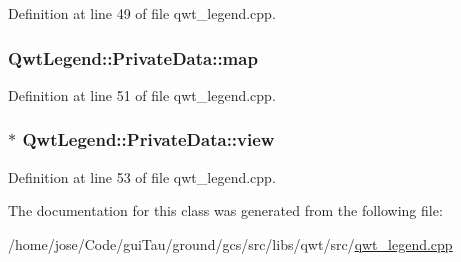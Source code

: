 Definition at line 49 of file qwt\-\_\-legend.\-cpp.

\hypertarget{class_qwt_legend_1_1_private_data_a921ea2a8e215eb723bb218ae2d199d15}{
\subsubsection[{map}]{ Qwt\-Legend\-::\-Private\-Data\-::map}}\label{class_qwt_legend_1_1_private_data_a921ea2a8e215eb723bb218ae2d199d15}


Definition at line 51 of file qwt\-\_\-legend.\-cpp.

\hypertarget{class_qwt_legend_1_1_private_data_ad63e70c48d0b352cf1d06ace388e253f}{
\subsubsection[{view}]{$\ast$ Qwt\-Legend\-::\-Private\-Data\-::view}}\label{class_qwt_legend_1_1_private_data_ad63e70c48d0b352cf1d06ace388e253f}


Definition at line 53 of file qwt\-\_\-legend.\-cpp.



The documentation for this class was generated from the following file\-:\begin{DoxyCompactItemize}
\item 
/home/jose/\-Code/gui\-Tau/ground/gcs/src/libs/qwt/src/\hyperlink{qwt__legend_8cpp}{qwt\-\_\-legend.\-cpp}\end{DoxyCompactItemize}
